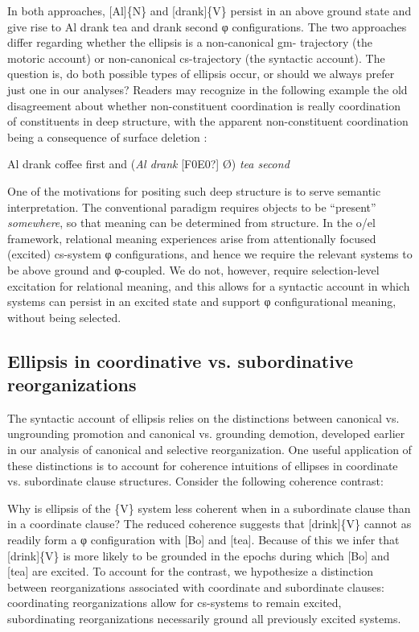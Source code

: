   In both approaches, [Al]\{N\} and [drank]\{V\} persist in an above ground state and give rise to {\textbar}Al drank tea{\textbar} and {\textbar}drank second{\textbar} φ configurations. The two approaches differ regarding whether the ellipsis is a non-canonical gm- trajectory (the motoric account) or non-canonical cs-trajectory (the syntactic account). The question is, do both possible types of ellipsis occur, or should we always prefer just one in our analyses? Readers may recognize in the following example the old disagreement about whether non-constituent coordination is really coordination of constituents in deep structure, with the apparent non-constituent coordination being a consequence of surface deletion \citep{DalrympleEtAl1991,Merchant2001,SagEtAl1985}: 

  \ea
{Al drank coffee first and} (\textit{Al drank} [F0E0?] Ø) \textit{tea second}
\z

  One of the motivations for positing such deep structure is to serve semantic interpretation. The conventional paradigm requires objects to be “present” \textit{somewhere}, so that meaning can be determined from structure. In the o/el framework, relational meaning experiences arise from attentionally focused (excited) cs-system φ configurations, and hence we require the relevant systems to be above ground and φ-coupled. We do not, however, require selection-level excitation for relational meaning, and this allows for a syntactic account in which systems can persist in an excited state and support φ configurational meaning, without being selected. 

\subsection{Ellipsis in coordinative vs. subordinative reorganizations}

The syntactic account of ellipsis relies on the distinctions between canonical vs. ungrounding promotion and canonical vs. grounding demotion, developed earlier in our analysis of canonical and selective reorganization. One useful application of these distinctions is to account for coherence intuitions of ellipses in coordinate vs. subordinate clause structures. Consider the following coherence contrast:

\ea
\z
\z
\judgewidth{*}

  Why is ellipsis of the \{V\} system less coherent when in a subordinate clause than in a coordinate clause? The reduced coherence suggests that [drink]\{V\} cannot as readily form a φ configuration with [Bo] and [tea]. Because of this we infer that [drink]\{V\} is more likely to be grounded in the epochs during which [Bo] and [tea] are excited. To account for the contrast, we hypothesize a distinction between reorganizations associated with coordinate and subordinate clauses: coordinating reorganizations allow for cs-systems to remain excited, subordinating reorganizations necessarily ground all previously excited systems. 

